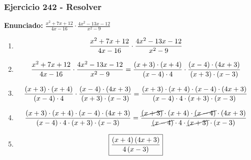 \documentclass[11pt,a4paper]{article}
\newcommand{\fitmath}[1]{%
\[
\setbox0=\hbox{$\displaystyle #1$}%
\ifdim\wd0>\linewidth
\resizebox{\linewidth}{!}{$\displaystyle #1$}%
\else
#1%
\fi
\]
}
\begin{document}
\subsubsection*{Ejercicio 242 - Resolver}
\textbf{Enunciado:} $ \frac{x^{2} + 7 x + 12}{4 x - 16} \cdot \frac{4 x^{2} - 13 x - 12}{x^{2} - 9} $\par
\begin{enumerate}[leftmargin=2em]
\item \fitmath{\frac{x^{2} + 7 x + 12}{4 x - 16} \cdot \frac{4 x^{2} - 13 x - 12}{x^{2} - 9}}
\item \fitmath{\frac{x^{2} + 7 x + 12}{4 x - 16} \cdot \frac{4 x^{2} - 13 x - 12}{x^{2} - 9}= \frac{\left(x + 3\right)\cdot \left(x + 4\right)}{\left(x - 4\right)\cdot 4} \cdot \frac{\left(x - 4\right)\cdot \left(4 x + 3\right)}{\left(x + 3\right)\cdot \left(x - 3\right)}}
\item \fitmath{\frac{\left(x + 3\right)\cdot \left(x + 4\right)}{\left(x - 4\right)\cdot 4}\cdot \frac{\left(x - 4\right)\cdot \left(4 x + 3\right)}{\left(x + 3\right)\cdot \left(x - 3\right)}= \frac{\left(x + 3\right)\cdot \left(x + 4\right)\cdot \left(x - 4\right)\cdot \left(4 x + 3\right)}{\left(x - 4\right)\cdot 4\cdot \left(x + 3\right)\cdot \left(x - 3\right)}}
\item \fitmath{\frac{\left(x + 3\right)\cdot \left(x + 4\right)\cdot \left(x - 4\right)\cdot \left(4 x + 3\right)}{\left(x - 4\right)\cdot 4\cdot \left(x + 3\right)\cdot \left(x - 3\right)}= \frac{\cancel{\left(x + 3\right)}\cdot \left(x + 4\right)\cdot \cancel{\left(x - 4\right)}\cdot \left(4 x + 3\right)}{\cancel{\left(x - 4\right)}\cdot 4\cdot \cancel{\left(x + 3\right)}\cdot \left(x - 3\right)}}
\item \fitmath{\boxed{\frac{\left(x + 4\right) \left(4 x + 3\right)}{4 \left(x - 3\right)}}}
\end{enumerate}

\vspace{0.12cm}
\end{document}
